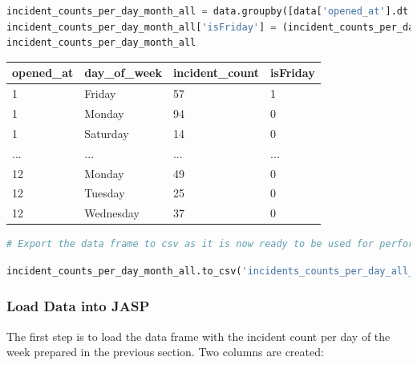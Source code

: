 \documentclass{article}
\begin{document}
\begin{lstlisting}[language=Python, breaklines=true]
incident_counts_per_day_month_all = data.groupby([data['opened_at'].dt.month, 'day_of_week']).size().reset_index(name='incident_count')
incident_counts_per_day_month_all['isFriday'] = (incident_counts_per_day_month_all['day_of_week'] == 'Friday').astype(int)
incident_counts_per_day_month_all
\end{lstlisting}

\begin{table}[htbp]
\centering
\begin{flushleft}
\begin{tabular}{|l|l|l|l|}
\hline
\textbf{opened\_at} & \textbf{day\_of\_week} & \textbf{incident\_count} & \textbf{isFriday} \\
\hline
1  & Friday    & 57  & 1 \\
1  & Monday    & 94  & 0 \\
1  & Saturday  & 14  & 0 \\

... & ...      & ... & ... \\
12 & Monday    & 49  & 0 \\
12 & Tuesday   & 25  & 0 \\
12 & Wednesday & 37  & 0 \\
\hline
\end{tabular}
\end{flushleft}
\end{table}

\begin{lstlisting}[language=Python, breaklines=true]
# Export the data frame to csv as it is now ready to be used for performing statistical tests.
\end{lstlisting}


\begin{lstlisting}[language=Python, breaklines=true]
incident_counts_per_day_month_all.to_csv('incidents_counts_per_day_all_months.csv', encoding='utf-8', index=False)
\end{lstlisting}

\subsubsection{Load Data into JASP}

The first step is to load the data frame with the incident count per day of the week prepared in the previous section. Two columns are created:
\end{document}

